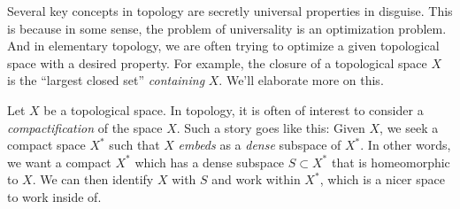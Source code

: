     Several key concepts in topology are secretly universal properties in disguise. 
    This is because in some sense, the problem of universality is an optimization problem.
    And in elementary topology, we are often trying to optimize a given topological 
    space with a desired property. For example, the closure of a topological 
    space $X$ is the ``largest closed set'' \emph{containing} $X$. We'll elaborate more on this.


    \begin{example}
        Let $X$ be a topological space. In topology, it is often of interest 
        to consider a \emph{compactification} of the space $X$. Such a story goes 
        like this: Given $X$, we seek a compact space $X^*$ such that $X$ \emph{embeds} as 
        a \emph{dense} subspace of $X^*$. In other words, we want a compact $X^*$ 
        which has a dense subspace $S \subset X^*$ that is homeomorphic to $X$.
        We can then identify $X$ with $S$ and work within $X^*$, which is a nicer 
        space to work inside of.
         \begin{center}
\end{center}
\end{example}
